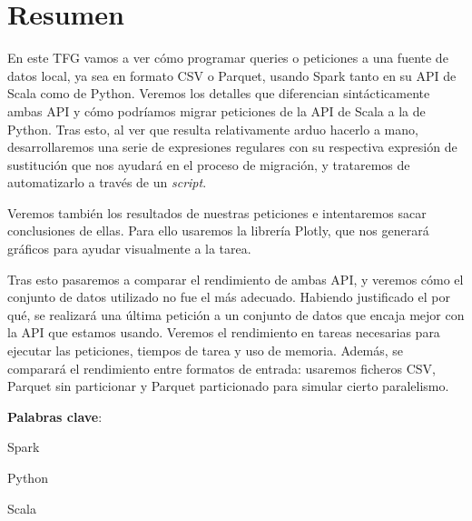 \documentclass[12pt,twoside,titlepage]{report}
\newcommand\blankpage{%
    \newpage
    \null
    \thispagestyle{empty}%
    \newpage}
\begin{document}
\afterpage{\blankpage}








\chapter*{Resumen}

En este TFG vamos a ver cómo programar queries o peticiones a una fuente de datos local, ya sea en formato CSV o Parquet, usando Spark tanto en su API de Scala como de Python. Veremos los detalles que diferencian sintácticamente ambas API y cómo podríamos migrar peticiones de la API de Scala a la de Python. Tras esto, al ver que resulta relativamente arduo hacerlo a mano, desarrollaremos una serie de expresiones regulares con su respectiva expresión de sustitución que nos ayudará en el proceso de migración, y trataremos de automatizarlo a través de un \textit{script}.

Veremos también los resultados de nuestras peticiones e intentaremos sacar conclusiones de ellas. Para ello usaremos la librería Plotly, que nos generará gráficos para ayudar visualmente a la tarea.

Tras esto pasaremos a comparar el rendimiento de ambas API, y veremos cómo el conjunto de datos utilizado no fue el más adecuado. Habiendo justificado el por qué, se realizará una última petición a un conjunto de datos que encaja mejor con la API que estamos usando. Veremos el rendimiento en tareas necesarias para ejecutar las peticiones, tiempos de tarea y uso de memoria. Además, se comparará el rendimiento entre formatos de entrada: usaremos ficheros CSV, Parquet sin particionar y Parquet particionado para simular cierto paralelismo.

\mbox{} \bigskip

\noindent \textbf{Palabras clave}:
\begin{compactitem}
    \item Spark
    \item Python
    \item Scala
\end{compactitem}

\afterpage{\blankpage}

\end{document}
